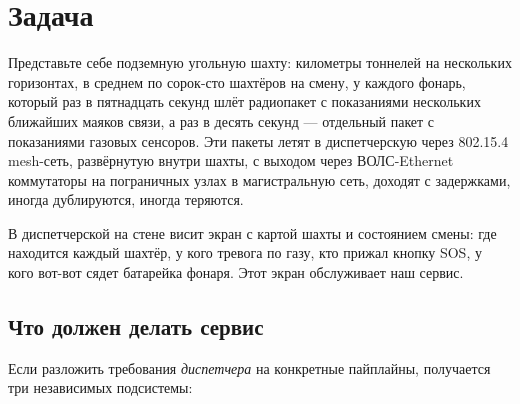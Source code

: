 
\section{Задача}

Представьте себе подземную угольную шахту: километры тоннелей на
нескольких горизонтах, в среднем по сорок-сто шахтёров на смену, у
каждого фонарь, который раз в пятнадцать секунд шлёт радиопакет с
показаниями нескольких ближайших маяков связи, а раз в десять секунд
--- отдельный пакет с показаниями газовых сенсоров. Эти пакеты летят
в диспетчерскую через 802.15.4 mesh-сеть, развёрнутую внутри шахты,
с выходом через ВОЛС-Ethernet коммутаторы на пограничных узлах в
магистральную сеть, доходят с задержками, иногда дублируются, иногда
теряются.

В диспетчерской на стене висит экран с картой шахты и состоянием
смены: где находится каждый шахтёр, у кого тревога по газу, кто
прижал кнопку SOS, у кого вот-вот сядет батарейка фонаря. Этот экран
обслуживает наш сервис.

\subsection{Что должен делать сервис}

Если разложить требования \emph{диспетчера} на конкретные пайплайны,
получается три независимых подсистемы:


